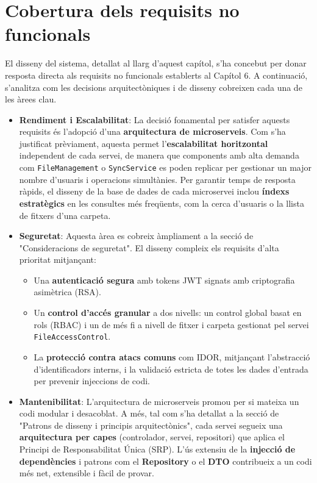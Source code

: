 \section{Cobertura dels requisits no funcionals}
El disseny del sistema, detallat al llarg d'aquest capítol, s'ha concebut per donar resposta directa als requisits no funcionals establerts al Capítol 6. A continuació, s'analitza com les decisions arquitectòniques i de disseny cobreixen cada una de les àrees clau.

\begin{itemize}
    \item \textbf{Rendiment i Escalabilitat}: La decisió fonamental per satisfer aquests requisits és l'adopció d'una \textbf{arquitectura de microserveis}. Com s'ha justificat prèviament, aquesta permet l'\textbf{escalabilitat horitzontal} independent de cada servei, de manera que components amb alta demanda com \texttt{FileManagement} o \texttt{SyncService} es poden replicar per gestionar un major nombre d'usuaris i operacions simultànies. Per garantir temps de resposta ràpids, el disseny de la base de dades de cada microservei inclou \textbf{índexs estratègics} en les consultes més freqüents, com la cerca d'usuaris o la llista de fitxers d'una carpeta.

    \item \textbf{Seguretat}: Aquesta àrea es cobreix àmpliament a la secció de "Consideracions de seguretat". El disseny compleix els requisits d'alta prioritat mitjançant:
    \begin{itemize}
        \item Una \textbf{autenticació segura} amb tokens JWT signats amb criptografia asimètrica (RSA).
        \item Un \textbf{control d'accés granular} a dos nivells: un control global basat en rols (RBAC) i un de més fi a nivell de fitxer i carpeta gestionat pel servei \texttt{FileAccessControl}.
        \item La \textbf{protecció contra atacs comuns} com IDOR, mitjançant l'abstracció d'identificadors interns, i la validació estricta de totes les dades d'entrada per prevenir injeccions de codi.
    \end{itemize}

    \item \textbf{Mantenibilitat}: L'arquitectura de microserveis promou per si mateixa un codi modular i desacoblat. A més, tal com s'ha detallat a la secció de "Patrons de disseny i principis arquitectònics", cada servei segueix una \textbf{arquitectura per capes} (controlador, servei, repositori) que aplica el Principi de Responsabilitat Única (SRP). L'ús extensiu de la \textbf{injecció de dependències} i patrons com el \textbf{Repository} o el \textbf{DTO} contribueix a un codi més net, extensible i fàcil de provar.


\end{itemize}
